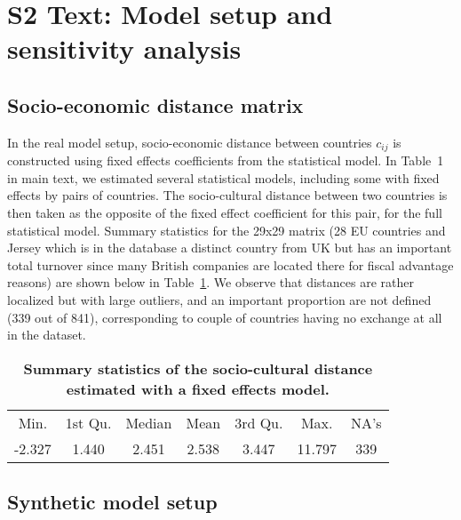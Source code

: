 

\renewcommand{\thetable}{S2-\Alph{table}}


\vspace*{0.35in}
\justify

\section*{S2 Text: Model setup and sensitivity analysis}


\subsection*{Socio-economic distance matrix}

In the real model setup, socio-economic distance between countries $c_{ij}$ is constructed using fixed effects coefficients from the statistical model. In Table~1 in main text, we estimated several statistical models, including some with fixed effects by pairs of countries. The socio-cultural distance between two countries is then taken as the opposite of the fixed effect coefficient for this pair, for the full statistical model. Summary statistics for the 29x29 matrix (28 EU countries and Jersey which is in the database a distinct country from UK but has an important total turnover since many British companies are located there for fiscal advantage reasons) are shown below in Table~\ref{tab:fixedeff}. We observe that distances are rather localized but with large outliers, and an important proportion are not defined (339 out of 841), corresponding to couple of countries having no exchange at all in the dataset.

\begin{table}[h!]
\caption{\textbf{Summary statistics of the socio-cultural distance estimated with a fixed effects model.}\label{tab:fixedeff}}
\begin{tabular}{ccccccc}
   Min. & 1st Qu. &  Median &  Mean &  3rd Qu. &  Max. &  NA's \\
 -2.327 &  1.440 &  2.451 &  2.538 &  3.447 & 11.797 &  339 
\end{tabular}
\end{table}

\subsection*{Synthetic model setup}

